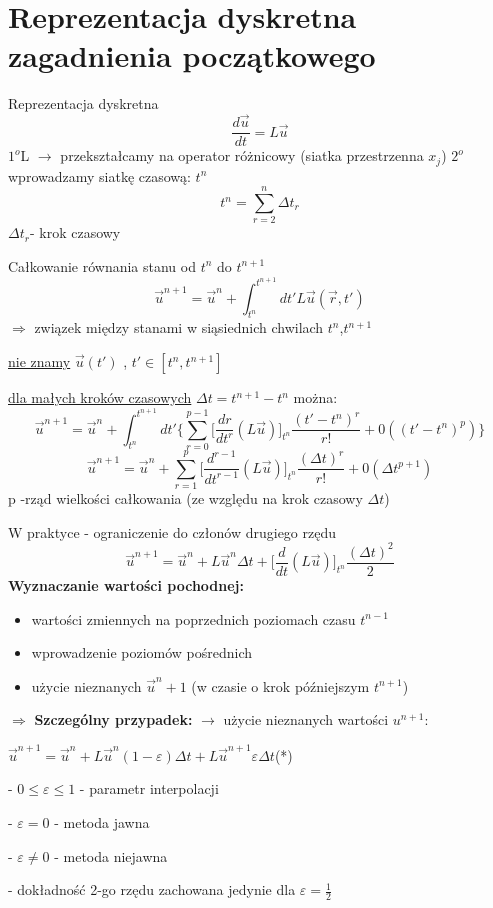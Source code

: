 \section{Reprezentacja dyskretna zagadnienia początkowego}
\begin{frame}{Reprezentacja dyskretna}
  $$\frac{d \vec{u}}{dt} = L\vec{u}$$
  $1^o$\quad L $\rightarrow$ przekształcamy na operator różnicowy (siatka przestrzenna $x_j$) \newline
  $2^o$ \quad wprowadzamy siatkę czasową: $t^n$ 
  $$t^n = \sum_{r=2}^{n}\Delta t_r$$
  $\Delta t_r $- krok czasowy
\end{frame}
\begin{frame}{Całkowanie równania stanu od $t^n$ do $t^{n+1}$}
  $${\vec{u}}^{n+1} = {\vec{u}}^n + \int_{t^n}^{t^{n+1}}dt' L\vec{u}(\vec{r},t')$$ 
  $\Rightarrow$ związek między stanami w siąsiednich chwilach $t^n$,$t^{n+1}$
  \begin{center}
  	\underline{nie znamy} \qquad $\vec{u}(t')$ , $t' \in [t^n,t^{n+1}]$ \par
  \end{center}
  \underline{dla małych kroków czasowych} $\Delta t = t^{n+1} - t^n$ można: 
  $${\vec{u}}^{n+1} = {\vec{u}}^n + \int_{t^n}^{t^{n+1}}dt'\Bigg\{ \sum_{r=0}^{p-1}\bigg[\frac{dr}{d t^r}(L\vec{u})\bigg]_{t^n}\frac{(t'-t^n)^r}{r!}+0((t'-t^n)^p)\Bigg\}$$
  $${\vec{u}}^{n+1} = {\vec{u}}^n + \sum_{r=1}^{p}\bigg[\frac{d^{r-1}}{d t^{r-1}}(L\vec{u})\bigg]_{t^n}\frac{(\Delta t)^r}{r!}+0(\Delta t^{p+1})$$
  p -rząd wielkości całkowania (ze względu na krok czasowy $\Delta t$)
\end{frame}
\begin{frame}{W praktyce - ograniczenie do członów drugiego rzędu}
  $$\vec{u} ^{n+1} = \vec{u} ^n + L\vec{u}^n\Delta t+\bigg[\frac{d}{dt}(L\vec{u})\bigg]_{t^n} \frac{(\Delta t)^2}{2}$$
  \textbf{Wyznaczanie wartości pochodnej:}
  \begin{itemize}
    \item wartości zmiennych na poprzednich poziomach czasu $t^{n-1}$
    \item wprowadzenie poziomów pośrednich
    \item użycie nieznanych $\vec{u}^n+1$ (w czasie o krok późniejszym $t^{n+1}$)
  \end{itemize}
  $\Rightarrow$ \textbf{Szczególny przypadek:} $\rightarrow$ użycie nieznanych wartości $u^{n+1}$:
  \begin{center}
  	$\vec{u}^{n+1} = \vec{u}^n+L\vec{u}^n(1-\varepsilon)\Delta t+L\vec{u}^{n+1}\varepsilon \Delta t $\qquad(*)
  \end{center}
  \begin{description}
    \item - $0 \leqslant \varepsilon \leqslant 1$ - parametr interpolacji
    \item - $\varepsilon = 0$ - metoda jawna 
    \item - $\varepsilon \not= 0$ - metoda niejawna
    \item - dokładność 2-go rzędu zachowana jedynie dla $\varepsilon=\frac{1}{2}$
  \end{description}
  
\end{frame}
